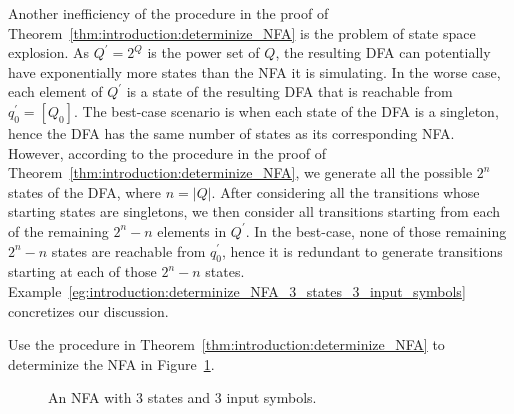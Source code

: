 Another inefficiency of the procedure in the proof of
Theorem~\ref{thm:introduction:determinize_NFA} is the problem of state
space explosion. As $Q^\prime = 2^Q$ is the power set of $Q$, the
resulting DFA can potentially have exponentially more states than the
NFA it is simulating. In the worse case, each element of $Q^\prime$ is
a state of the resulting DFA that is reachable from
$q_0^\prime = [Q_0]$. The best-case scenario is when each state of the
DFA is a singleton, hence the DFA has the same number of states as its
corresponding NFA. However, according to the procedure in the proof of
Theorem~\ref{thm:introduction:determinize_NFA}, we generate all the
possible $2^n$ states of the DFA, where $n = |Q|$. After considering
all the transitions whose starting states are singletons, we then
consider all transitions starting from each of the remaining
$2^n - n$ elements in $Q^\prime$. In the best-case, none of those
remaining $2^n - n$ states are reachable from $q_0^\prime$, hence it
is redundant to generate transitions starting at each of those
$2^n - n$ states.
Example~\ref{eg:introduction:determinize_NFA_3_states_3_input_symbols}
concretizes our discussion.

\begin{example}
\label{eg:introduction:determinize_NFA_3_states_3_input_symbols}
Use the procedure in Theorem~\ref{thm:introduction:determinize_NFA} to
determinize the NFA in
Figure~\ref{fig:introduction:NFA_3_states_3_input_symbols}.
\end{example}

\begin{figure}[!htbp]
\centering

\caption{An NFA with $3$ states and $3$ input symbols.}
\label{fig:introduction:NFA_3_states_3_input_symbols}
\end{figure}

